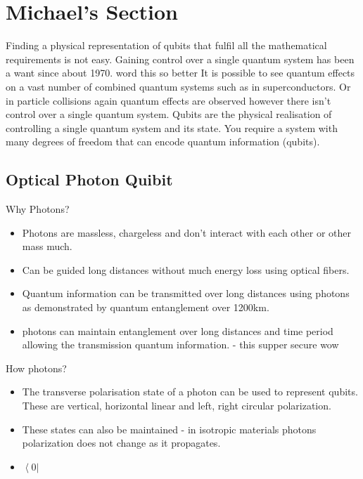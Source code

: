 \section{Michael's Section}
Finding a physical representation of qubits that fulfil all the mathematical requirements is not easy.
Gaining control over a single quantum system has been a want since about 1970. word this so better
It is possible to see quantum effects on a vast number of combined quantum systems such as in superconductors. \cite{nielsen_quantum_2010}
Or in particle collisions again quantum effects are observed however there isn't control over a single quantum system.
Qubits are the physical realisation of controlling a single quantum system and its state.
You require a system with many degrees of freedom that can encode quantum information (qubits). \cite{bergou_quantum_2021}

\subsection{Optical Photon Quibit}

Why Photons?
\begin{itemize}
    \item Photons are massless, chargeless and don't interact with each other or other mass much. \cite{nielsen_quantum_2010}
    \item Can be guided long distances without much energy loss using optical fibers. \cite{nielsen_quantum_2010}
    \item Quantum information can be transmitted over long distances using photons as demonstrated by quantum entanglement over 1200km. \cite{yin_satellite-based_2017}
    \item photons can maintain entanglement over long distances and time period allowing the transmission quantum information. - this supper secure wow \cite{thibault_team_nodate}
\end{itemize}


How photons?

\begin{itemize}
    \item The transverse polarisation state of a photon can be used to represent qubits. 
    These are vertical, horizontal linear and left, right circular polarization. \cite{bergou_quantum_2021}
    \item These states can also be maintained - in isotropic materials photons polarization does not change as it propagates. \cite{bergou_quantum_2021}
    \item $\left\langle 0 \right\vert $
\end{itemize}
